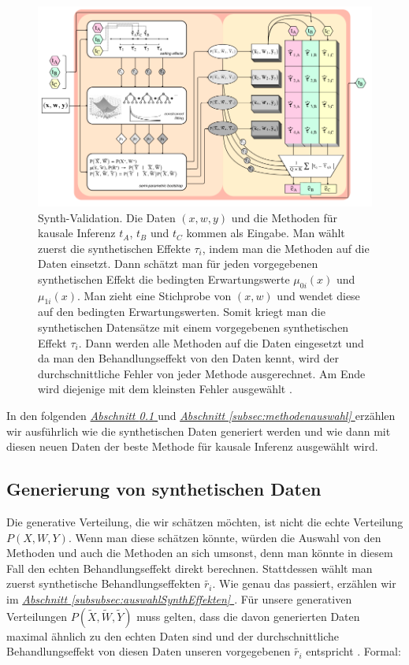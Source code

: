 \documentclass[12pt,a4paper,twoside]{scrartcl}
\numberwithin{equation}{section}
\newcommand{\refsec}[1]{\emph{\hyperref[#1]{Abschnitt \ref*{#1} }}}
\begin{document}
\begin{center}
  \vspace{6mm}
  \begin{figure}[h]
    \centering
    \includegraphics[height=0.5\textwidth, width=1\textwidth]{figures/synth-validation.png}
    \caption[Synth-Validation] {Synth-Validation\cite{schuler2017synth}. Die Daten $(x,w,y)$ und die Methoden für kausale Inferenz $t_A$, $t_B$ und $t_C$ kommen als Eingabe. Man wählt zuerst die synthetischen Effekte $\tau_i$, indem man die Methoden auf die Daten einsetzt. Dann schätzt man für jeden vorgegebenen synthetischen Effekt die bedingten Erwartungswerte $\mu_{0i}(x)$ und $\mu_{1i}(x)$. Man zieht eine Stichprobe von $(x,w)$ und wendet diese auf den bedingten Erwartungswerten. Somit kriegt man die synthetischen Datensätze mit einem vorgegebenen synthetischen Effekt $\tau_i$. Dann werden alle Methoden auf die Daten eingesetzt und da man den Behandlungseffekt von den Daten kennt, wird der durchschnittliche Fehler von jeder Methode ausgerechnet. Am Ende wird diejenige mit dem kleinsten Fehler ausgewählt \cite{schuler2017synth}.}\label{fig:synthValidation}
  \end{figure}
\end{center}

\noindent
In den folgenden \refsec{subsec:generierungSynthDaten} und \refsec{subsec:methodenauswahl} erzählen wir ausführlich wie die synthetischen Daten generiert werden und wie dann mit diesen neuen Daten der beste Methode für kausale Inferenz ausgewählt wird.\par

  	\subsection{Generierung von synthetischen Daten}\label{subsec:generierungSynthDaten}
  	Die generative Verteilung, die wir schätzen möchten, ist nicht die echte Verteilung $P(X,W,Y)$. Wenn man diese schätzen könnte, würden die Auswahl von den Methoden und auch die Methoden an sich umsonst, denn man könnte in diesem Fall den echten Behandlungseffekt direkt berechnen. Stattdessen wählt man zuerst synthetische Behandlungseffekten $\tilde{r_i}$. Wie genau das passiert, erzählen wir im \refsec{subsubsec:auswahlSynthEffekten}. Für unsere generativen Verteilungen  $P(\widetilde{X},\widetilde{W},\widetilde{Y})$ muss gelten, dass die davon generierten Daten maximal ähnlich zu den echten Daten sind und der durchschnittliche Behandlungseffekt von diesen Daten unseren vorgegebenen $\tilde{r_i}$  entspricht \cite{schuler2017synth}. Formal:\par
  	
\end{document}
